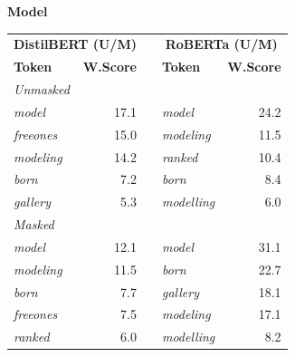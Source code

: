 \documentclass[11pt]{article}
\begin{document}
\vspace{4pt}\noindent\textbf{Model}
\begin{center}\scriptsize
\begin{tabular}{lrllr}
\toprule
\multicolumn{2}{c}{\textbf{DistilBERT (U/M)}} & & \multicolumn{2}{c}{\textbf{RoBERTa (U/M)}} \\
\textbf{Token} & \textbf{W.Score} & & \textbf{Token} & \textbf{W.Score} \\
\midrule
\multicolumn{5}{l}{\textit{Unmasked}} \\
\emph{model} & 17.1 & & \emph{model} & 24.2 \\
\emph{freeones} & 15.0 & & \emph{modeling} & 11.5 \\
\emph{modeling} & 14.2 & & \emph{ranked} & 10.4 \\
\emph{born} & 7.2 & & \emph{born} & 8.4 \\
\emph{gallery} & 5.3 & & \emph{modelling} & 6.0 \\
\multicolumn{5}{l}{\textit{Masked}} \\
\emph{model} & 12.1 & & \emph{model} & 31.1 \\
\emph{modeling} & 11.5 & & \emph{born} & 22.7 \\
\emph{born} & 7.7 & & \emph{gallery} & 18.1 \\
\emph{freeones} & 7.5 & & \emph{modeling} & 17.1 \\
\emph{ranked} & 6.0 & & \emph{modelling} & 8.2 \\
\bottomrule
\end{tabular}
\end{center}
\end{document}
